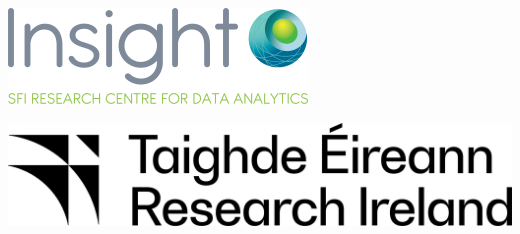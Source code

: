 \documentclass[11pt,oneside]{book}
\begin{document}
\begin{samepage}
\begin{minipage}[c][0.21\linewidth][c]{0.21\linewidth}
        \includegraphics[width=\linewidth]{LT-EDI-2025/sponsor_logos/insight.png}
      \end{minipage}\hspace{0.05\linewidth}
          \begin{minipage}[c][0.21\linewidth][c]{0.21\linewidth}
        \includegraphics[width=\linewidth]{LT-EDI-2025/sponsor_logos/Research_Ireland.png}
      \end{minipage}\hspace{0.05\linewidth}
    

\end{samepage}
\end{document}
